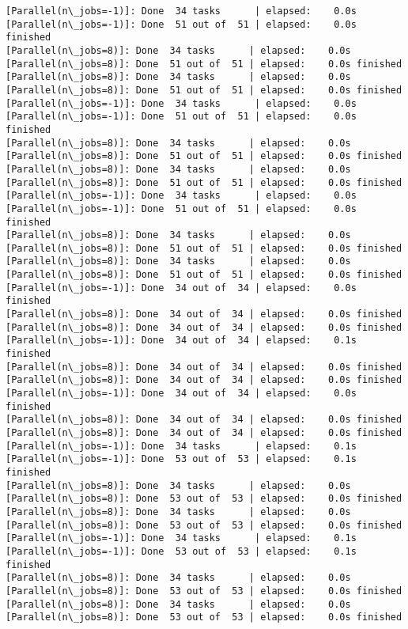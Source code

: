 \documentclass[11pt]{article}
\begin{document}
\begin{Verbatim}[commandchars=\\\{\}]
[Parallel(n\_jobs=-1)]: Done  34 tasks      | elapsed:    0.0s
[Parallel(n\_jobs=-1)]: Done  51 out of  51 | elapsed:    0.0s finished
[Parallel(n\_jobs=8)]: Done  34 tasks      | elapsed:    0.0s
[Parallel(n\_jobs=8)]: Done  51 out of  51 | elapsed:    0.0s finished
[Parallel(n\_jobs=8)]: Done  34 tasks      | elapsed:    0.0s
[Parallel(n\_jobs=8)]: Done  51 out of  51 | elapsed:    0.0s finished
[Parallel(n\_jobs=-1)]: Done  34 tasks      | elapsed:    0.0s
[Parallel(n\_jobs=-1)]: Done  51 out of  51 | elapsed:    0.0s finished
[Parallel(n\_jobs=8)]: Done  34 tasks      | elapsed:    0.0s
[Parallel(n\_jobs=8)]: Done  51 out of  51 | elapsed:    0.0s finished
[Parallel(n\_jobs=8)]: Done  34 tasks      | elapsed:    0.0s
[Parallel(n\_jobs=8)]: Done  51 out of  51 | elapsed:    0.0s finished
[Parallel(n\_jobs=-1)]: Done  34 tasks      | elapsed:    0.0s
[Parallel(n\_jobs=-1)]: Done  51 out of  51 | elapsed:    0.0s finished
[Parallel(n\_jobs=8)]: Done  34 tasks      | elapsed:    0.0s
[Parallel(n\_jobs=8)]: Done  51 out of  51 | elapsed:    0.0s finished
[Parallel(n\_jobs=8)]: Done  34 tasks      | elapsed:    0.0s
[Parallel(n\_jobs=8)]: Done  51 out of  51 | elapsed:    0.0s finished
[Parallel(n\_jobs=-1)]: Done  34 out of  34 | elapsed:    0.0s finished
[Parallel(n\_jobs=8)]: Done  34 out of  34 | elapsed:    0.0s finished
[Parallel(n\_jobs=8)]: Done  34 out of  34 | elapsed:    0.0s finished
[Parallel(n\_jobs=-1)]: Done  34 out of  34 | elapsed:    0.1s finished
[Parallel(n\_jobs=8)]: Done  34 out of  34 | elapsed:    0.0s finished
[Parallel(n\_jobs=8)]: Done  34 out of  34 | elapsed:    0.0s finished
[Parallel(n\_jobs=-1)]: Done  34 out of  34 | elapsed:    0.0s finished
[Parallel(n\_jobs=8)]: Done  34 out of  34 | elapsed:    0.0s finished
[Parallel(n\_jobs=8)]: Done  34 out of  34 | elapsed:    0.0s finished
[Parallel(n\_jobs=-1)]: Done  34 tasks      | elapsed:    0.1s
[Parallel(n\_jobs=-1)]: Done  53 out of  53 | elapsed:    0.1s finished
[Parallel(n\_jobs=8)]: Done  34 tasks      | elapsed:    0.0s
[Parallel(n\_jobs=8)]: Done  53 out of  53 | elapsed:    0.0s finished
[Parallel(n\_jobs=8)]: Done  34 tasks      | elapsed:    0.0s
[Parallel(n\_jobs=8)]: Done  53 out of  53 | elapsed:    0.0s finished
[Parallel(n\_jobs=-1)]: Done  34 tasks      | elapsed:    0.1s
[Parallel(n\_jobs=-1)]: Done  53 out of  53 | elapsed:    0.1s finished
[Parallel(n\_jobs=8)]: Done  34 tasks      | elapsed:    0.0s
[Parallel(n\_jobs=8)]: Done  53 out of  53 | elapsed:    0.0s finished
[Parallel(n\_jobs=8)]: Done  34 tasks      | elapsed:    0.0s
[Parallel(n\_jobs=8)]: Done  53 out of  53 | elapsed:    0.0s finished

\end{Verbatim}
\end{document}
